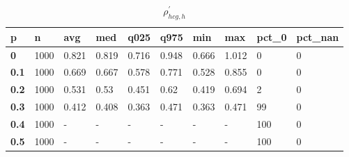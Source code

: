 \begin{table}[h]
 \centering 
\footnotesize
\caption{$\rho_{hcg,h}^\prime $}
\label{tab:alphahcgh}
\begin{tabular}[h]{|l|l|l|l|l|l|l|l|l|l|
    } \hline
\textbf{ p} & \textbf{ n} & \textbf{ avg} & \textbf{ med} & \textbf{ q025} & \textbf{ q975} & \textbf{ min} & \textbf{ max} & \textbf{ pct\_0} & \textbf{ pct\_nan}
    \\ \hline
  \textbf{  0} & 1000 & 0.821 & 0.819 & 0.716 & 0.948 & 0.666 & 1.012 &   0 & 0
    \\ \hline
  \textbf{0.1} & 1000 & 0.669 & 0.667 & 0.578 & 0.771 & 0.528 & 0.855 &   0 & 0
    \\ \hline
  \textbf{0.2} & 1000 & 0.531 &  0.53 & 0.451 &  0.62 & 0.419 & 0.694 &   2 & 0
    \\ \hline
  \textbf{0.3} & 1000 & 0.412 & 0.408 & 0.363 & 0.471 & 0.363 & 0.471 &  99 & 0
    \\ \hline
  \textbf{0.4} & 1000 & - & - & - & - & - & - & 100 & 0
    \\ \hline
  \textbf{0.5} & 1000 & - & - & - & - & - & - & 100 & 0
    \\ \hline
 \end{tabular}
 \end{table}
